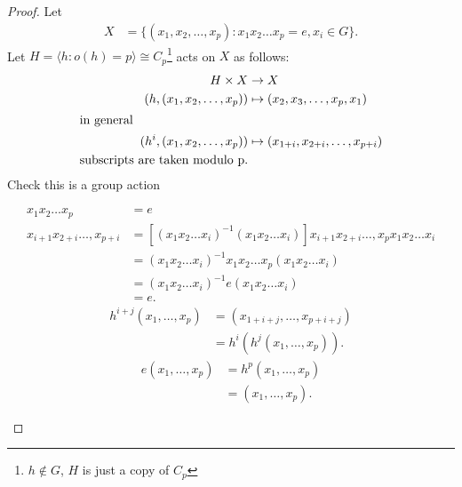 \begin{proof}
    Let
    \begin{align*}
        X &= \{ (x_1, x_2, \dots, x_p) : x_1 x_2 \dots x_p = e, x_i \in G \}.
    \end{align*} 
    Let $H = \langle h : o(h) = p \rangle \cong C_p$\footnote{$h \notin G$, $H$ is just a copy of $C_p$} acts on $X$ as follows:
    \begin{align*}
        H \times X &\to X \\
        (h, (x_1, x_2, \dots, x_p)) &\mapsto (x_2, x_3, \dots, x_p, x_1) \\
        \intertext{in general}
        (h^i, (x_1, x_2, \dots, x_p)) &\mapsto (x_{1 + i}, x_{2 + i}, \dots, x_{p + i}) \\
        \text{subscripts are taken modulo p.}
    \end{align*}
    Check this is a group action
    \begin{enumerate} \addtocounter{enumi}{-1}
        \mathitem \begin{align*}
            x_1 x_2 \dots x_p &= e \\
            x_{i + 1} x_{2 + i} \dots, x_{p + i} &= [(x_1 x_2 \dots x_i)^{-1} (x_1 x_2 \dots x_i)] x_{i + 1} x_{2 + i} \dots, x_{p} x_1 x_2 \dots x_i \\ 
            &= (x_1 x_2 \dots x_i)^{-1} x_1 x_2 \dots x_p (x_1 x_2 \dots x_i) \\
            &= (x_1 x_2 \dots x_i)^{-1} e (x_1 x_2 \dots x_i) \\
            &= e.
        \end{align*} 
        \mathitem \begin{align*}
            h^{i + j} (x_1, \dots, x_p) &= (x_{1 + i + j}, \dots, x_{p + i + j}) \\
            &= h^i (h^j (x_1, \dots, x_p)).
        \end{align*} 
        \mathitem \begin{align*}
            e (x_1, \dots, x_p) &= h^p (x_1, \dots, x_p) \\
            &= (x_1, \dots, x_p).
        \end{align*} 
    \end{enumerate} 


\end{proof}
